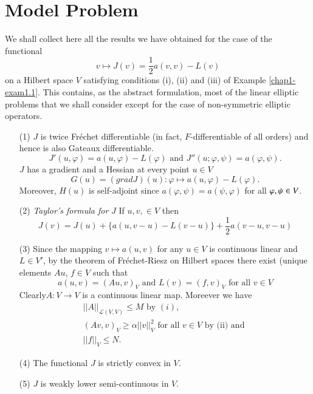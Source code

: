 \section{Model Problem}\label{chap1-sec7}
We shall collect here all the results we have obtained for the case of the functional
$$
v \mapsto J(v) = \frac{1}{2} a(v, v) - L(v)
$$
on a Hilbert space $V$ satisfying conditions (i), (ii) and (iii) of Example \ref{chap1-exam1.1}. This contains, as the abstract formulation, most of the linear elliptic problems that we shall consider except for the case of non-symmetric elliptic operators.
\begin{enumerate}
\item[(1)] $J$ is twice Fr\'{e}chet differentiable (in fact, $F$-differentiable of all orders) and hence is also Gateaux differentiable.
$$
J'(u, \varphi) = a(u, \varphi) - L(\varphi) \text{ and } J''(u ; \varphi, \psi) =a(\varphi, \psi).
$$
$J$ has a gradient and a Hessian at every point $u \in V$
$$
G(u) = (grad J)(u) : \varphi \mapsto a(u, \varphi) - L(\varphi).
$$
Moreover, $H(u)$ is self-adjoint since $a(\varphi, \psi) = a(\psi, \varphi)$ for all $\varphi,\break \psi \in V$.

\item[(2)] {\textit{Taylor's formula for}} $J$ If $u, v, \in V$ then
$$
J(v) = J(u) + \{a(u, v - u) -L(v - u)\} + \frac{1}{2} a(v - u, v - u)
$$

\item[(3)] Since the mapping $v \mapsto a(u, v)$ for any $u \in V$ is continuous linear and $L \in V'$, by the theorem of Fr\'{e}chet-Riesz on Hilbert spaces there exist (unique elements $A u$, $f \in V$ such that
$$
a(u, v) = (A u, v)_{V} \text{ and } L(v) = (f, v)_{V} \text{ for all } v \in V
$$
Clearly\pageoriginale $A : V \to V$ is a continuous linear map. Moreever we have
\begin{align*}
||A||_{\mathscr{L}(V, V)} \leq M \text{ by } (i),\\
(Av, v)_{V} \geq \alpha||v||_{V}^{2} \text{ for all } v \in V \text{ by (ii) and }\\
||f||_{V} \leq N.
\end{align*}
\item[(4)] The functional $J$ is strictly convex in $V$.

\item[(5)] $J$ is weakly lower semi-continuous in $V$.
\end{enumerate}

